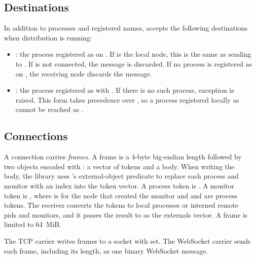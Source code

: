 \subsection {Destinations}

In addition to processes and registered names,  accepts the
following destinations when distribution is running:\antipar

\begin{itemize}
\item {}: the process registered as
   on . If  is the local node, this is
  the same as sending to . If  is not connected,
  the message is discarded. If no process is registered as 
  on , the receiving node discards the message.

\item {}: the process registered as
   with . If there is no such process,
  exception  is raised. This
  form takes precedence over , so a
  process registered locally as  cannot be reached as
  .
\end{itemize}

\subsection {Connections}

A connection carries \emph{frames}. A frame
is a 4-byte big-endian length followed by two objects encoded with
: a vector of tokens and a body. When writing the
body, the library uses 's external-object predicate
to replace each process and monitor with an index into the token
vector. A process token is . A monitor token is , where  is  for the node that created the monitor and
 and  are process tokens. The receiver
converts the tokens to local processes or interned remote pids and
monitors, and it passes the result to  as the
externals vector. A frame is limited to 64~MiB.

The TCP carrier writes frames to a socket with 
set. The WebSocket carrier sends each frame, including its length, as
one binary WebSocket message.

